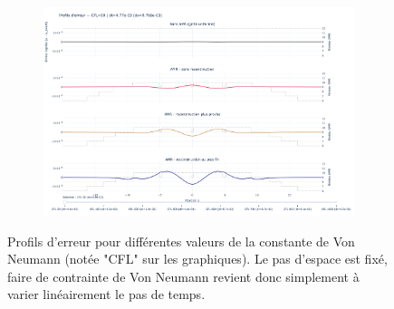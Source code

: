 \begin{figure}[p]
{\begin{minipage}{\textheight}
\begin{subfigure}{0.32\textwidth}
    \includegraphics[width=\linewidth]{media/4_travail/3/03_error_profile_small_cfl.png}
\end{subfigure}

\caption{Profils d'erreur pour différentes valeurs de la constante de Von Neumann (notée "CFL" sur les graphiques). Le pas d'espace est fixé, 
faire de contrainte de Von Neumann revient donc simplement à varier linéairement le pas de temps.}
\label{fig:error_profiles_landscape}
\end{minipage}%
}
\end{figure}
\clearpage
